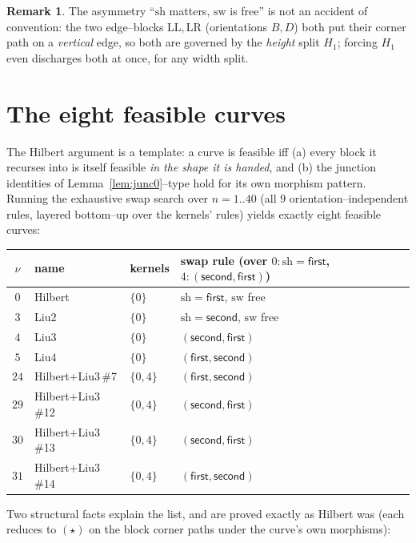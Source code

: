 \documentclass[11pt]{article}
\theoremstyle{definition}
\newtheorem{remark}{Remark}
\newcommand{\LL}{\mathrm{LL}}
\newcommand{\LR}{\mathrm{LR}}
\begin{document}
\begin{remark}
The asymmetry ``$\mathrm{sh}$ matters, $\mathrm{sw}$ is free'' is not an accident of
convention: the two edge--blocks $\LL,\LR$ (orientations $B,D$) both put their corner path
on a \emph{vertical} edge, so both are governed by the \emph{height} split $H_1$; forcing
$H_1$ even discharges both at once, for any width split.
\end{remark}

\section{The eight feasible curves}\label{sec:feasible}

The Hilbert argument is a template: a curve is feasible iff (a) every block it recurses into
is itself feasible \emph{in the shape it is handed}, and (b) the junction identities of
Lemma~\ref{lem:junc0}--type hold for its own morphism pattern. Running the exhaustive swap
search over $n=1..40$ (all $9$ orientation--independent rules, layered bottom--up over the
kernels' rules) yields exactly eight feasible curves:

\begin{center}
\begin{tabular}{clll}
\toprule
$\nu$ & name & kernels & swap rule (over $0:\mathrm{sh}=\textsf{first}$, $4:(\textsf{second},\textsf{first})$)\\
\midrule
$0$ & Hilbert & $\{0\}$ & $\mathrm{sh}=\textsf{first}$, $\mathrm{sw}$ free\\
$3$ & Liu$2$ & $\{0\}$ & $\mathrm{sh}=\textsf{second}$, $\mathrm{sw}$ free\\
$4$ & Liu$3$ & $\{0\}$ & $(\textsf{second},\textsf{first})$\\
$5$ & Liu$4$ & $\{0\}$ & $(\textsf{first},\textsf{second})$\\
$24$ & Hilbert+Liu$3$\,\#7 & $\{0,4\}$ & $(\textsf{first},\textsf{second})$\\
$29$ & Hilbert+Liu$3$\,\#12 & $\{0,4\}$ & $(\textsf{second},\textsf{first})$\\
$30$ & Hilbert+Liu$3$\,\#13 & $\{0,4\}$ & $(\textsf{second},\textsf{first})$\\
$31$ & Hilbert+Liu$3$\,\#14 & $\{0,4\}$ & $(\textsf{first},\textsf{second})$\\
\bottomrule
\end{tabular}
\end{center}

Two structural facts explain the list, and are proved exactly as Hilbert was (each reduces
to $(\star)$ on the block corner paths under the curve's own morphisms):
\end{document}
